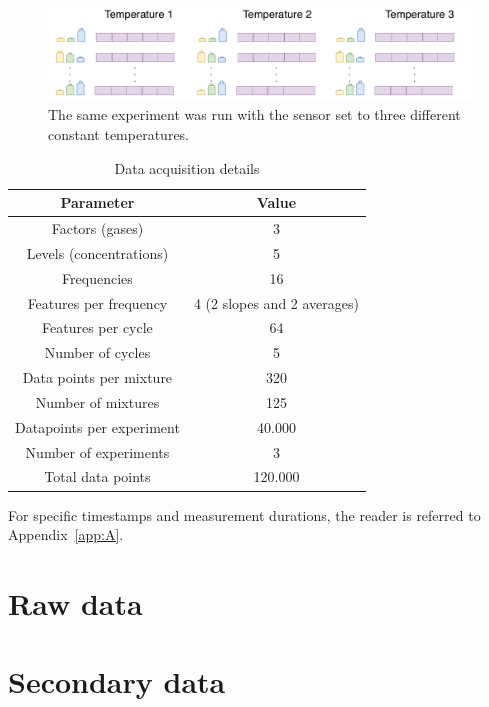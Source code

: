 \begin{figure}[!htb]
	\centering
	\includegraphics[width=1\textwidth]{../figures/temps.pdf}
	\caption{The same experiment was run with the sensor set to three different constant temperatures.}
	\label{fig:temps}
\end{figure}

\begin{table}[h]
	\centering
	\caption{Data acquisition details}
	\label{tab:measurements}
	\begin{tabular}{|c|c|}
		\hline
		\textbf{Parameter} & \textbf{Value} \\
		\hline
		Factors (gases) & 3 \\
		\hline
		Levels (concentrations) & 5 \\
		\hline
		Frequencies & 16 \\
		\hline
		Features per frequency & 4 (2 slopes and 2 averages) \\
		\hline
		Features per cycle & 64 \\
		\hline
		Number of cycles & 5 \\
		\hline
		Data points per mixture & 320 \\
		\hline
		Number of mixtures & 125 \\
		\hline
		Datapoints per experiment & 40.000 \\
		\hline
		Number of experiments & 3 \\
		\hline
		Total data points & 120.000 \\
		\hline
	\end{tabular}
\end{table}

For specific timestamps and measurement durations, the reader is referred to Appendix~\ref{app:A}.

\section{Raw data}
\label{sec:raw-data}

\section{Secondary data}
\label{sec:secondary-data}
